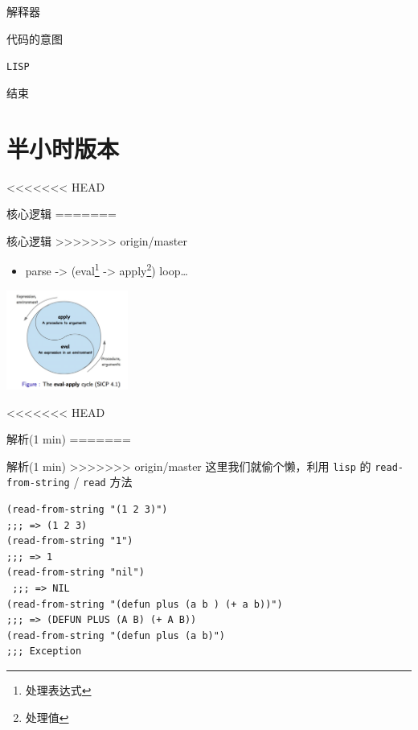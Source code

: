 \documentclass[presentation, bigger]{beamer}
\begin{document}
\begin{frame}[label={sec:org106539d},fragile]{解释器}
\begin{frame}[label={sec:org3020c49},fragile]{代码的意图}
\begin{frame}[label={sec:org3aa0441},fragile]{\texttt{LISP}}
\begin{frame}[label={sec:orgae54002}]{结束}
\section{半小时版本}
<<<<<<< HEAD
\label{sec:org83842ef}
\begin{frame}[label={sec:orgdceac76}]{核心逻辑}
=======
\label{sec:org701a80c}
\begin{frame}[label={sec:org2d32788}]{核心逻辑}
>>>>>>> origin/master
\begin{itemize}
\item parse -> (eval\footnote{处理表达式} -> apply\footnote{处理值}) loop\ldots{}
\end{itemize}
\begin{center}
\includegraphics[width=0.3\textwidth]{./img/eval-apply.png}
\end{center}
\end{frame}
<<<<<<< HEAD
\begin{frame}[label={sec:org629dbc5},fragile]{解析(1 min)}
=======
\begin{frame}[fragile,label={sec:orgaa054ab}]{解析(1 min)}
>>>>>>> origin/master
 这里我们就偷个懒，利用 \texttt{lisp} 的 \texttt{read-from-string} / \texttt{read} 方法

\begin{lstlisting}
(read-from-string "(1 2 3)")
;;; => (1 2 3)
(read-from-string "1")
;;; => 1
(read-from-string "nil")
 ;;; => NIL
(read-from-string "(defun plus (a b ) (+ a b))")
;;; => (DEFUN PLUS (A B) (+ A B))
(read-from-string "(defun plus (a b)")
;;; Exception
\end{lstlisting}
\end{frame}


\end{frame}
\end{frame}
\end{frame}
\end{frame}
\end{frame}
\end{frame}
\end{document}

